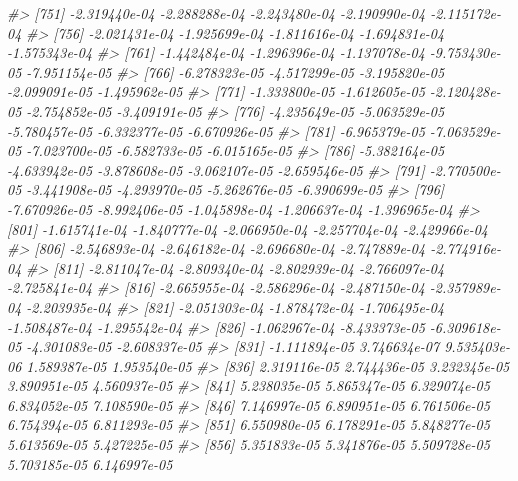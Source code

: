 \documentclass[
]{article}
\newenvironment{Shaded}{\begin{snugshade}}{\end{snugshade}}
\newcommand{\CommentTok}[1]{\textcolor[rgb]{0.56,0.35,0.01}{\textit{#1}}}
\begin{document}
\begin{Shaded}
\begin{Highlighting}[]
\CommentTok{\#\textgreater{} [751] {-}2.319440e{-}04 {-}2.288288e{-}04 {-}2.243480e{-}04 {-}2.190990e{-}04 {-}2.115172e{-}04}
\CommentTok{\#\textgreater{} [756] {-}2.021431e{-}04 {-}1.925699e{-}04 {-}1.811616e{-}04 {-}1.694831e{-}04 {-}1.575343e{-}04}
\CommentTok{\#\textgreater{} [761] {-}1.442484e{-}04 {-}1.296396e{-}04 {-}1.137078e{-}04 {-}9.753430e{-}05 {-}7.951154e{-}05}
\CommentTok{\#\textgreater{} [766] {-}6.278323e{-}05 {-}4.517299e{-}05 {-}3.195820e{-}05 {-}2.099091e{-}05 {-}1.495962e{-}05}
\CommentTok{\#\textgreater{} [771] {-}1.333800e{-}05 {-}1.612605e{-}05 {-}2.120428e{-}05 {-}2.754852e{-}05 {-}3.409191e{-}05}
\CommentTok{\#\textgreater{} [776] {-}4.235649e{-}05 {-}5.063529e{-}05 {-}5.780457e{-}05 {-}6.332377e{-}05 {-}6.670926e{-}05}
\CommentTok{\#\textgreater{} [781] {-}6.965379e{-}05 {-}7.063529e{-}05 {-}7.023700e{-}05 {-}6.582733e{-}05 {-}6.015165e{-}05}
\CommentTok{\#\textgreater{} [786] {-}5.382164e{-}05 {-}4.633942e{-}05 {-}3.878608e{-}05 {-}3.062107e{-}05 {-}2.659546e{-}05}
\CommentTok{\#\textgreater{} [791] {-}2.770500e{-}05 {-}3.441908e{-}05 {-}4.293970e{-}05 {-}5.262676e{-}05 {-}6.390699e{-}05}
\CommentTok{\#\textgreater{} [796] {-}7.670926e{-}05 {-}8.992406e{-}05 {-}1.045898e{-}04 {-}1.206637e{-}04 {-}1.396965e{-}04}
\CommentTok{\#\textgreater{} [801] {-}1.615741e{-}04 {-}1.840777e{-}04 {-}2.066950e{-}04 {-}2.257704e{-}04 {-}2.429966e{-}04}
\CommentTok{\#\textgreater{} [806] {-}2.546893e{-}04 {-}2.646182e{-}04 {-}2.696680e{-}04 {-}2.747889e{-}04 {-}2.774916e{-}04}
\CommentTok{\#\textgreater{} [811] {-}2.811047e{-}04 {-}2.809340e{-}04 {-}2.802939e{-}04 {-}2.766097e{-}04 {-}2.725841e{-}04}
\CommentTok{\#\textgreater{} [816] {-}2.665955e{-}04 {-}2.586296e{-}04 {-}2.487150e{-}04 {-}2.357989e{-}04 {-}2.203935e{-}04}
\CommentTok{\#\textgreater{} [821] {-}2.051303e{-}04 {-}1.878472e{-}04 {-}1.706495e{-}04 {-}1.508487e{-}04 {-}1.295542e{-}04}
\CommentTok{\#\textgreater{} [826] {-}1.062967e{-}04 {-}8.433373e{-}05 {-}6.309618e{-}05 {-}4.301083e{-}05 {-}2.608337e{-}05}
\CommentTok{\#\textgreater{} [831] {-}1.111894e{-}05  3.746634e{-}07  9.535403e{-}06  1.589387e{-}05  1.953540e{-}05}
\CommentTok{\#\textgreater{} [836]  2.319116e{-}05  2.744436e{-}05  3.232345e{-}05  3.890951e{-}05  4.560937e{-}05}
\CommentTok{\#\textgreater{} [841]  5.238035e{-}05  5.865347e{-}05  6.329074e{-}05  6.834052e{-}05  7.108590e{-}05}
\CommentTok{\#\textgreater{} [846]  7.146997e{-}05  6.890951e{-}05  6.761506e{-}05  6.754394e{-}05  6.811293e{-}05}
\CommentTok{\#\textgreater{} [851]  6.550980e{-}05  6.178291e{-}05  5.848277e{-}05  5.613569e{-}05  5.427225e{-}05}
\CommentTok{\#\textgreater{} [856]  5.351833e{-}05  5.341876e{-}05  5.509728e{-}05  5.703185e{-}05  6.146997e{-}05}

\end{Highlighting}
\end{Shaded}
\end{document}
